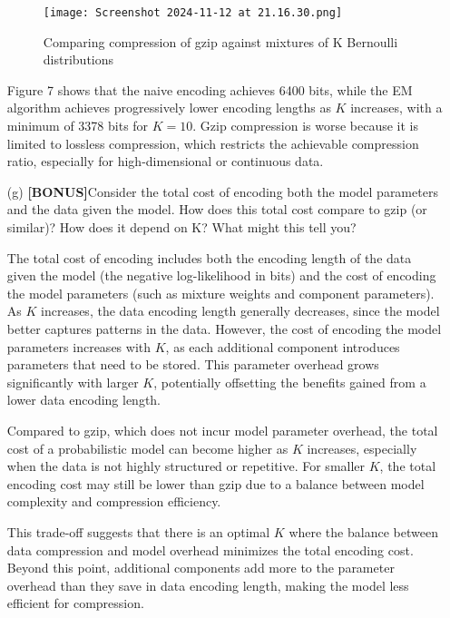 \documentclass{article}
\begin{document}
\begin{enumerate}
    \begin{figure}[H]
        \centering
        \texttt{[image: Screenshot 2024-11-12 at 21.16.30.png]}
        \caption{Comparing compression of gzip against mixtures of K Bernoulli distributions}
        \label{fig:enter-label}
    \end{figure} 
    
    Figure 7 shows that the naive encoding achieves 6400 bits, while the EM algorithm achieves progressively lower encoding lengths as \( K \) increases, with a minimum of 3378 bits for \( K=10 \). Gzip compression is worse because it is limited to lossless compression, which restricts the achievable compression ratio, especially for high-dimensional or continuous data. 

    \vspace{10pt}


    \item[(g)] \textbf{[BONUS]}Consider the total cost of encoding both the model parameters and the data given the model. How does this total cost compare to gzip (or similar)? How does it depend on K? What might this tell you?
    
    
    The total cost of encoding includes both the encoding length of the data given the model (the negative log-likelihood in bits) and the cost of encoding the model parameters (such as mixture weights and component parameters). As \( K \) increases, the data encoding length generally decreases, since the model better captures patterns in the data. However, the cost of encoding the model parameters increases with \( K \), as each additional component introduces parameters that need to be stored. This parameter overhead grows significantly with larger \( K \), potentially offsetting the benefits gained from a lower data encoding length.
    \vspace{0.8em}
    
    Compared to gzip, which does not incur model parameter overhead, the total cost of a probabilistic model can become higher as \( K \) increases, especially when the data is not highly structured or repetitive. For smaller \( K \), the total encoding cost may still be lower than gzip due to a balance between model complexity and compression efficiency. 
    \vspace{0.8em}
    
    This trade-off suggests that there is an optimal \( K \) where the balance between data compression and model overhead minimizes the total encoding cost. Beyond this point, additional components add more to the parameter overhead than they save in data encoding length, making the model less efficient for compression.    

\end{enumerate}
\end{document}
